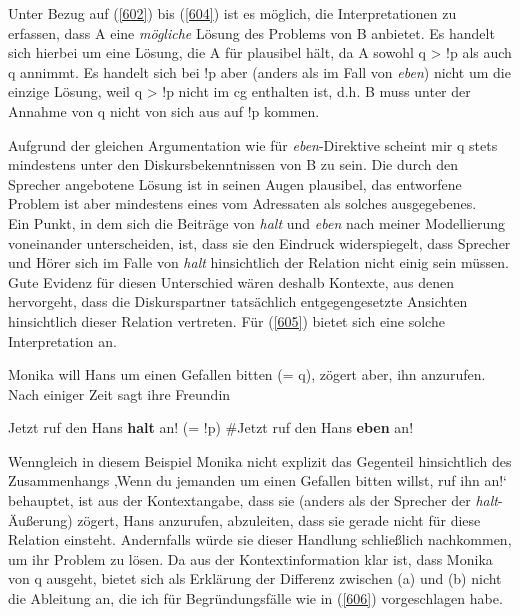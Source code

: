 Unter Bezug auf (\ref{602}) bis (\ref{604}) ist es möglich, die Interpretationen zu erfassen, dass A eine \emph{mögliche} Lösung des Problems von B anbietet. Es handelt sich hierbei um eine Lösung, die A für plausibel hält, da A sowohl q > !p als auch q annimmt. Es handelt sich bei !p aber (anders als im Fall von \textit{eben}) nicht um die einzige Lösung, weil q > !p nicht im cg enthalten ist, d.h. B muss unter der Annahme von q nicht von sich aus auf !p kommen.

Aufgrund der gleichen Argumentation wie für \textit{eben}-Direktive scheint mir q stets mindestens unter den Diskursbekenntnissen von B zu sein. Die durch den Sprecher angebotene Lösung ist in seinen Augen plausibel, das entworfene Problem ist aber mindestens eines vom Adressaten als solches ausgegebenes.\\

\noindent
Ein Punkt, in dem sich die Beiträge von \textit{halt} und \textit{eben} nach meiner Modellierung voneinander unterscheiden, ist, dass sie den Eindruck widerspiegelt, dass Sprecher und Hörer sich im Falle von \textit{halt} hinsichtlich der Relation nicht einig sein müssen. Gute Evidenz für diesen Unterschied wären deshalb Kontexte, aus denen hervorgeht, dass die Diskurspartner tatsächlich entgegengesetzte Ansichten hinsichtlich dieser Relation vertreten. Für (\ref{605}) bietet sich eine solche Interpretation an.

\begin{exe}
	\ex\label{605} Monika will Hans um einen Gefallen bitten (= q), zögert aber, ihn anzurufen. Nach einiger Zeit sagt ihre 			Freundin
		\begin{xlist}	
			\ex\label{605a} Jetzt ruf den Hans \textbf{halt} an! (= !p)
			\ex\label{605b} \#Jetzt ruf den Hans \textbf{eben} an!
		\end{xlist}
\end{exe}
Wenngleich in diesem Beispiel Monika nicht explizit das Gegenteil hinsichtlich des Zusammenhangs ‚Wenn du jemanden um einen Gefallen bitten willst, ruf ihn an!‘ behauptet, ist aus der Kontextangabe, dass sie (anders als der Sprecher der \textit{halt}-Äußerung) zögert, Hans anzurufen, abzuleiten, dass sie gerade nicht für diese Relation einsteht. Andernfalls würde sie dieser Handlung schließlich nachkommen, um ihr Problem zu lösen. Da aus der Kontextinformation klar ist, dass Monika von q ausgeht, bietet sich als Erklärung der Differenz zwischen (a) und (b) nicht die Ableitung an, die ich für Begründungsfälle wie in (\ref{606}) vorgeschlagen habe.

